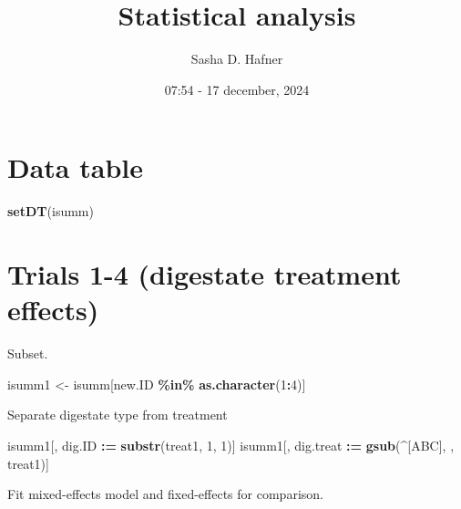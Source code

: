 \documentclass[
]{article}
\title{Statistical analysis}
\author{Sasha D. Hafner}
\date{07:54 - 17 december, 2024}
\newenvironment{Shaded}{\begin{snugshade}}{\end{snugshade}}
\newcommand{\DecValTok}[1]{\textcolor[rgb]{0.00,0.00,0.81}{#1}}
\newcommand{\FunctionTok}[1]{\textcolor[rgb]{0.13,0.29,0.53}{\textbf{#1}}}
\newcommand{\NormalTok}[1]{#1}
\newcommand{\OtherTok}[1]{\textcolor[rgb]{0.56,0.35,0.01}{#1}}
\newcommand{\SpecialCharTok}[1]{\textcolor[rgb]{0.81,0.36,0.00}{\textbf{#1}}}
\newcommand{\StringTok}[1]{\textcolor[rgb]{0.31,0.60,0.02}{#1}}
\begin{document}
\maketitle

\section{Data table}\label{data-table}

\begin{Shaded}
\begin{Highlighting}[]
\FunctionTok{setDT}\NormalTok{(isumm)}
\end{Highlighting}
\end{Shaded}

\section{Trials 1-4 (digestate treatment
effects)}\label{trials-1-4-digestate-treatment-effects}

Subset.

\begin{Shaded}
\begin{Highlighting}[]
\NormalTok{isumm1 }\OtherTok{\textless{}{-}}\NormalTok{ isumm[new.ID }\SpecialCharTok{\%in\%} \FunctionTok{as.character}\NormalTok{(}\DecValTok{1}\SpecialCharTok{:}\DecValTok{4}\NormalTok{)]}
\end{Highlighting}
\end{Shaded}

Separate digestate type from treatment

\begin{Shaded}
\begin{Highlighting}[]
\NormalTok{isumm1[, dig.ID }\SpecialCharTok{:=} \FunctionTok{substr}\NormalTok{(treat1, }\DecValTok{1}\NormalTok{, }\DecValTok{1}\NormalTok{)]}
\NormalTok{isumm1[, dig.treat }\SpecialCharTok{:=} \FunctionTok{gsub}\NormalTok{(}\StringTok{\textquotesingle{}\^{}[ABC]\textquotesingle{}}\NormalTok{, }\StringTok{\textquotesingle{}\textquotesingle{}}\NormalTok{, treat1)]}
\end{Highlighting}
\end{Shaded}

Fit mixed-effects model and fixed-effects for comparison.
\end{document}
